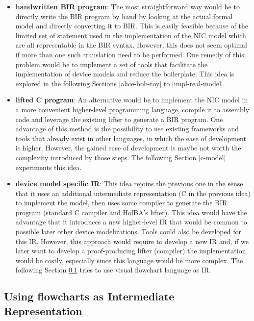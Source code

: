 \documentclass{kththesis}
\begin{document}
{\begin{itemize}
    \item \textbf{handwritten BIR program}: The most straightforward way would be to directly write the BIR program by hand by looking at the actual formal model and directly converting it to BIR. This is easily feasible because of the limited set of statement used in the implementation of the NIC model which are all representable in the BIR syntax. However, this does not seem optimal if more than one such translation need to be performed. One remedy of this problem would be to implement a set of tools that facilitate the implementation of device models and reduce the boilerplate. This idea is explored in the following Sections \ref{alice-bob-toy} to \ref{impl-real-model}.
    \item \textbf{lifted C program}: An alternative would be to implement the NIC model in a more convenient higher-level programming language, compile it to assembly code and leverage the existing lifter to generate a BIR program. One advantage of this method is the possibility to use existing frameworks and tools that already exist in other languages, in which the ease of development is higher. However, the gained ease of development is maybe not worth the complexity introduced by those steps. The following Section \ref{c-model} experiments this idea.
    \item \textbf{device model specific \gls{IR}}: This idea rejoins the previous one in the sense that it uses an additional intermediate representation (C in the previous idea) to implement the model, then uses some compiler to generate the BIR program (standard C compiler and HolBA's lifter). This idea would have the advantage that it introduces a new higher-level IR that would be common to possible later other device modelizations. Tools could also be developed for this IR. However, this approach would require to develop a new IR and, if we later want to develop a \gls{proof-producing} lifter (compiler) the implementation would be costly, especially since this language would be more complex. The following Section \ref{flowchart-attempt} tries to use visual flowchart language as IR. %
\end{itemize}

\subsection{Using flowcharts as Intermediate Representation} \label{flowchart-attempt}

}
\end{document}
